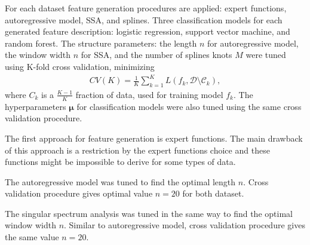 \documentclass{llncs}
\begin{document}
For each dataset feature generation procedures are applied: expert functions, autoregressive model, SSA, and splines. 
Three classification models for each generated feature description: logistic regression, support vector machine, and random forest. 
The structure parameters: the length $n$ for autoregressive model, the window width $n$ for SSA, and the number of splines knots $M$ were tuned using K-fold cross validation, minimizing
\begin{align}\label{cv}
CV(K) = \frac{1}{K}\sum_{k=1}^{K} L(f_k, \mathcal{D}\setminus \mathcal{C}_k),
\end{align}
where $C_k$ is a $\frac{K-1}{K}$ fraction of data, used for training model $f_k$.
The hyperparameters $\bm{\mu}$ for classification models were also tuned using the same cross validation procedure. 

The first approach for feature generation is expert functions. The main drawback of this approach is a restriction by the expert functions choice and these functions might be impossible to derive for some types of data.

The autoregressive model was tuned to find the optimal length $n$. Cross validation procedure gives optimal value $n=20$ for both dataset. 

The singular spectrum analysis was tuned in the same way to find the optimal window width $n$. Similar to autoregressive model, cross validation procedure gives the same value $n=20$.
\end{document}
